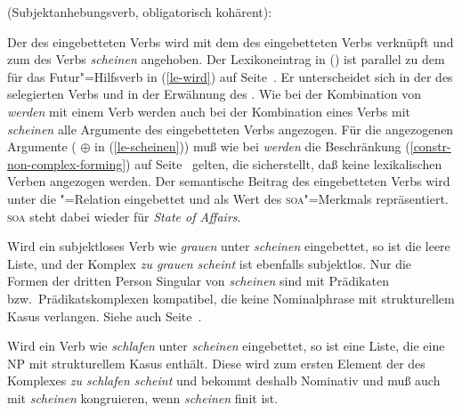 {\eas
\label{le-scheinen}
 (Subjektanhebungsverb, obligatorisch kohärent):\\
\zs

\noindent
Der \subjw des eingebetteten Verbs  wird mit dem \compsw des
eingebetteten Verbs  verknüpft und zum \compsw des Verbs \emph{scheinen} angehoben.
Der Lexikoneintrag in () ist parallel zu dem für das Futur"=Hilfsverb in (\ref{le-wird})
auf Seite~\pageref{le-wird}. Er unterscheidet sich in der \vform des selegierten Verbs und in der Erwähnung des \subjms.
Wie bei der Kombination von \emph{werden} mit einem Verb werden auch bei der Kombination
eines Verbs mit \emph{scheinen} alle Argumente des eingebetteten Verbs angezogen.
Für die angezogenen Argumente ( $\oplus$  in (\ref{le-scheinen})) muß wie bei \emph{werden}
die Beschränkung (\ref{constr-non-complex-forming}) auf Seite~\pageref{constr-non-complex-forming} gelten,
die sicherstellt, daß keine lexikalischen Verben angezogen werden.
Der semantische Beitrag des eingebetteten Verbs wird unter die "=Relation eingebettet
und als Wert des \textsc{soa}"=Merkmals repräsentiert. \textsc{soa} steht dabei wieder für \emph{State of Affairs}.

Wird ein subjektloses Verb wie \emph{grauen} unter \emph{scheinen} eingebettet, so
ist  die leere Liste, und der Komplex \emph{zu grauen scheint} ist ebenfalls
subjektlos. Nur die Formen der dritten Person Singular von \emph{scheinen}
sind mit Prädikaten bzw.\ Prädikatskomplexen kompatibel, 
die keine Nominalphrase mit strukturellem Kasus verlangen. Siehe auch Seite~\pageref{page-kongruenz-scheinen}.

Wird ein Verb wie \emph{schlafen} unter \emph{scheinen} eingebettet, so ist
 eine Liste, die eine NP mit strukturellem Kasus enthält. Diese wird
zum ersten Element der \compsl des Komplexes \emph{zu schlafen scheint} und bekommt
deshalb Nominativ und muß auch mit \emph{scheinen} kongruieren,
wenn \emph{scheinen} finit ist.

}
